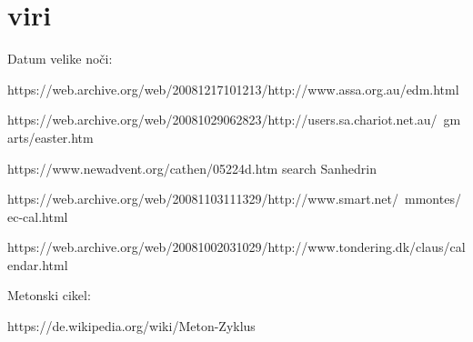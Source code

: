 \section*{viri}
Datum velike noči:

https://web.archive.org/web/20081217101213/http://www.assa.org.au/edm.html

https://web.archive.org/web/20081029062823/http://users.sa.chariot.net.au/~gmarts/easter.htm

https://www.newadvent.org/cathen/05224d.htm search Sanhedrin

https://web.archive.org/web/20081103111329/http://www.smart.net/~mmontes/ec-cal.html

https://web.archive.org/web/20081002031029/http://www.tondering.dk/claus/calendar.html



Metonski cikel:

https://de.wikipedia.org/wiki/Meton-Zyklus


